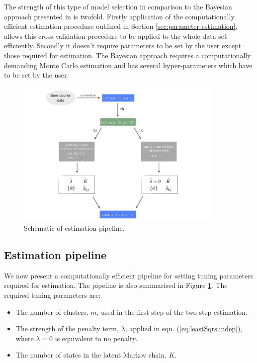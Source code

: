 The strength of this type of model selection in comparison to the Bayesian approach presented in \cite{Armond:2013} is twofold. Firstly application of the computationally efficient estimation procedure outlined in Section \ref{sec:parameter-estimation}, allows this cross-validation procedure to be applied to the whole data set efficiently. Secondly it doesn't require parameters to be set by the user except those required for estimation. The Bayesian approach requires a computationally demanding Monte Carlo estimation and has several hyper-parameters which have to be set by the user. 

\begin{figure}
  \centering
  \includegraphics[width=0.9\textwidth]{pics/pipeline.pdf}
  \caption{Schematic of estimation pipeline.}
  \label{fig:pipeline}
\end{figure}

\subsection{Estimation pipeline}
\label{sec:estim-pipe}

We now present a computationally efficient pipeline for setting tuning parameters required for estimation. The pipeline is also summarised in Figure \ref{fig:pipeline}. The required tuning parameters are:

\begin{itemize}
\item The number of clusters, $m$, used in the first step of the two-step estimation.
\item The strength of the penalty term, $\lambda$, applied in eqn. (\ref{eq:leastSqrs.indep}), where $\lambda=0$ is equivalent to no penalty.
\item The number of states in the latent Markov chain, $K$.
\end{itemize}

